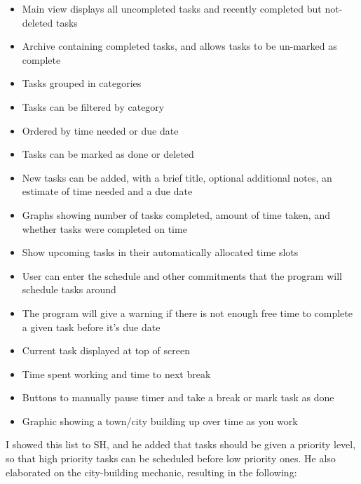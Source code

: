 \documentclass{article}
\begin{document}
\begin{itemize}
	\item Main view displays all uncompleted tasks and recently completed but
	      not-deleted tasks
	\item Archive containing completed tasks, and allows tasks to be un-marked as
	      complete
	\item Tasks grouped in categories
	\item Tasks can be filtered by category
	\item Ordered by time needed or due date
	\item Tasks can be marked as done or deleted
	\item New tasks can be added, with a brief title, optional additional notes, an
	      estimate of time needed and a due date
	\item Graphs showing number of tasks completed, amount of time taken, and
	      whether tasks were completed on time
	\item Show upcoming tasks in their automatically allocated time slots
	\item User can enter the schedule and other commitments that the program will
	      schedule tasks around
	\item The program will give a warning if there is not enough free time to
	      complete a given task before it's due date
	\item Current task displayed at top of screen
	\item Time spent working and time to next break
	\item Buttons to manually pause timer and take a break or mark task as done
	\item Graphic showing a town/city building up over time as you work
\end{itemize}

I showed this list to SH, and he added that tasks should be given a priority
level, so that high priority tasks can be scheduled before low priority ones. He
also elaborated on the city-building mechanic, resulting in the following:
\end{document}

